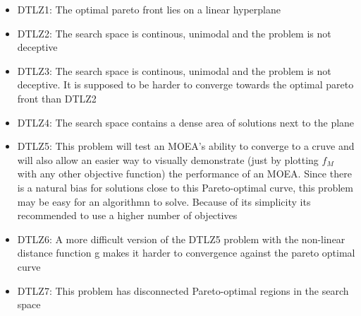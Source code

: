     \begin{itemize}
        \item DTLZ1: The optimal pareto front lies on a linear hyperplane
        \item DTLZ2: The search space is continous, unimodal and the problem is not deceptive
        \item DTLZ3: The search space is continous, unimodal and the problem is not deceptive. It is supposed to be harder to converge towards the optimal pareto front than DTLZ2
        \item DTLZ4: The search space contains a dense area of solutions next to the plane
        \item DTLZ5: This problem will test an MOEA’s ability to converge to a cruve and will also allow an easier way to visually demonstrate (just by plotting $f_M$ with any other objective function) the performance of an MOEA. Since there is a natural bias for solutions close to this Pareto-optimal curve, this problem may be easy for an algorithmn to solve. Because of its simplicity its recommended to use a higher number of objectives
        \item DTLZ6: A more difficult version of the DTLZ5 problem with the non-linear distance function g makes it harder to convergence against the pareto optimal curve
        \item DTLZ7: This problem has disconnected Pareto-optimal regions in the search space
    \end{itemize}


